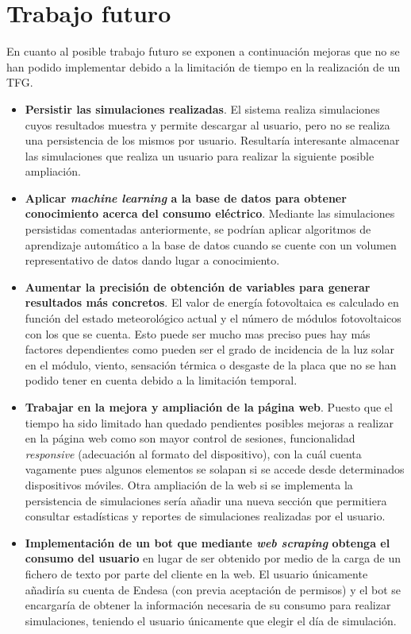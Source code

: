 \section{Trabajo futuro}
En cuanto al posible trabajo futuro se exponen a continuación mejoras que no se han podido implementar debido a la limitación de tiempo en la realización de un \gls{TFG}.
\begin{itemize}
\item \textbf{Persistir las simulaciones realizadas}. El sistema realiza simulaciones cuyos resultados muestra y permite descargar al usuario, pero no se realiza una persistencia de los mismos por usuario. Resultaría interesante almacenar las simulaciones que realiza un usuario para realizar la siguiente posible ampliación.
\item \textbf{Aplicar \textit{machine learning} a la base de datos para obtener conocimiento acerca del consumo eléctrico}. Mediante las simulaciones persistidas comentadas anteriormente, se podrían aplicar algoritmos de aprendizaje automático a la base de datos cuando se cuente con un volumen representativo de datos dando lugar a conocimiento.
\item \textbf{Aumentar la precisión de obtención de variables para generar resultados más concretos}. El valor de energía fotovoltaica es calculado en función del estado meteorológico actual y el número de módulos fotovoltaicos con los que se cuenta. Esto puede ser mucho mas preciso pues hay más factores dependientes como pueden ser el grado de incidencia de la luz solar en el módulo, viento, sensación térmica o desgaste de la placa que no se han podido tener en cuenta debido a la limitación temporal.
\item \textbf{Trabajar en la mejora y ampliación de la página web}. Puesto que el tiempo ha sido limitado han quedado pendientes posibles mejoras a realizar en la página web como son mayor control de sesiones, funcionalidad \textit{responsive} (adecuación al formato del dispositivo), con la cuál cuenta vagamente pues algunos elementos se solapan si se accede desde determinados dispositivos móviles. Otra ampliación de la web si se implementa la persistencia de simulaciones sería añadir una nueva sección que permitiera consultar estadísticas y reportes de simulaciones realizadas por el usuario.
\item \textbf{Implementación de un bot que mediante \textit{web scraping} obtenga el consumo del usuario} en lugar de ser obtenido por medio de la carga de un fichero de texto por parte del cliente en la web. El usuario únicamente añadiría su cuenta de Endesa (con previa aceptación de permisos) y el bot se encargaría de obtener la información necesaria de su consumo para realizar simulaciones, teniendo el usuario únicamente que elegir el día de simulación.
\end{itemize}
